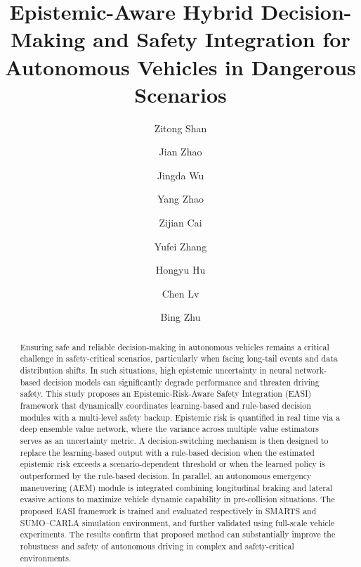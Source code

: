 \documentclass[preprint,12pt,authoryear]{elsarticle}
\begin{document}
\begin{frontmatter}


\title{Epistemic-Aware Hybrid Decision-Making and Safety Integration for Autonomous Vehicles in Dangerous Scenarios}

\author[label1,label2]{Zitong Shan}
\author[label1]{Jian Zhao}
\author[label3]{Jingda Wu}
\author[label1]{Yang Zhao}
\author[label1]{Zijian Cai}
\author[label1]{Yufei Zhang}
\author[label1]{Hongyu Hu}
\author[label2]{Chen Lv}
\author[label1]{Bing Zhu}




\begin{abstract}
Ensuring safe and reliable decision-making in autonomous vehicles remains a critical challenge in safety-critical scenarios, particularly when facing long-tail events and data distribution shifts. In such situations, high epistemic uncertainty in neural network-based decision models can significantly degrade performance and threaten driving safety. 
This study proposes an Epistemic-Risk-Aware Safety Integration (EASI) framework that dynamically coordinates learning-based and rule-based decision modules with a multi-level safety backup. Epistemic risk is quantified in real time via a deep ensemble value network, where the variance across multiple value estimators serves as an uncertainty metric. A decision-switching mechanism is then designed to replace the learning-based output with a rule-based decision when the estimated epistemic risk exceeds a scenario-dependent threshold or when the learned policy is outperformed by the rule-based decision.
In parallel, an autonomous emergency maneuvering (AEM) module is integrated combining longitudinal braking and lateral evasive actions to maximize vehicle dynamic capability in pre-collision situations.
The proposed EASI framework is trained and evaluated respectively in SMARTS and SUMO–CARLA simulation environment, and further validated using full-scale vehicle experiments.
The results confirm that proposed method can substantially improve the robustness and safety of autonomous driving in complex and safety-critical environments.


\end{abstract}
\end{frontmatter}
\end{document}
